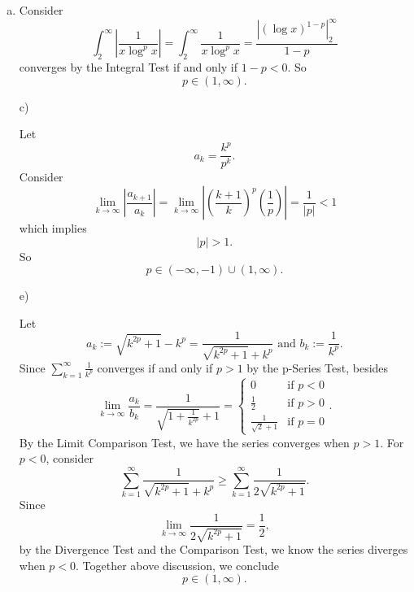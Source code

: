 \begin{Exercise}
\begin{enumerate}[a)]
\item
\begin{solution}
Consider $$\int_{2}^{\infty}\left|\frac{1}{x\log^p{x}}\right| = \int_{2}^{\infty}\frac{1}{x\log^p{x}} = \frac{\left|(\log{x})^{1-p}\right|_{2}^{\infty}}{1-p} $$
converges by the Integral Test if and only if $1-p<0$. So $$p \in (1,\infty).$$
\end{solution}

\item [c)]
\begin{solution}
Let $$a_k = \frac{k^p}{p^k}. $$
Consider
$$\lim_{k\to\infty}\left|\frac{a_{k+1}}{a_k}\right| = \lim_{k\to\infty}\left|\left(\frac{k+1}{k}\right)^p\left(\frac{1}{p}\right)\right| = \frac{1}{|p|} < 1$$
which implies $$|p|>1.$$
So$$p\in(-\infty,-1)\cup (1,\infty).$$
\end{solution}

\item [e)]
\begin{solution}
Let $$a_k := \sqrt{k^{2p}+1}-k^p = \frac{1}{\sqrt{k^{2p}+1}+k^p}\text{ and } b_k := \frac{1}{k^p}.$$
Since $\sum_{k=1}^{\infty}\frac{1}{k^p}$ converges if and only if $p>1$ by the p-Series Test, besides
$$\lim_{k\to\infty}\frac{a_k}{b_k} = \frac{1}{\sqrt{1+\frac{1}{k^{2p}}}+1} = \begin{cases}0 & \mbox{if }p<0 \\ \frac{1}{2} & \mbox{if }p>0 \\ \frac{1}{\sqrt{2}+1} & \mbox{if } p = 0\end{cases}.$$
By the Limit Comparison Test, we have the series converges when $p>1$. For $p<0$, consider $$\sum_{k=1}^{\infty}\frac{1}{\sqrt{k^{2p}+1}+k^p} \geq \sum_{k=1}^{\infty}\frac{1}{2\sqrt{k^{2p}+1}}.$$
Since $$\lim_{k\to\infty}\frac{1}{2\sqrt{k^{2p}+1}} = \frac{1}{2},$$
by the Divergence Test and the Comparison Test, we know the series diverges when $p<0$.
Together above discussion, we conclude $$p\in(1,\infty).$$
\end{solution}
\end{enumerate}
\end{Exercise}